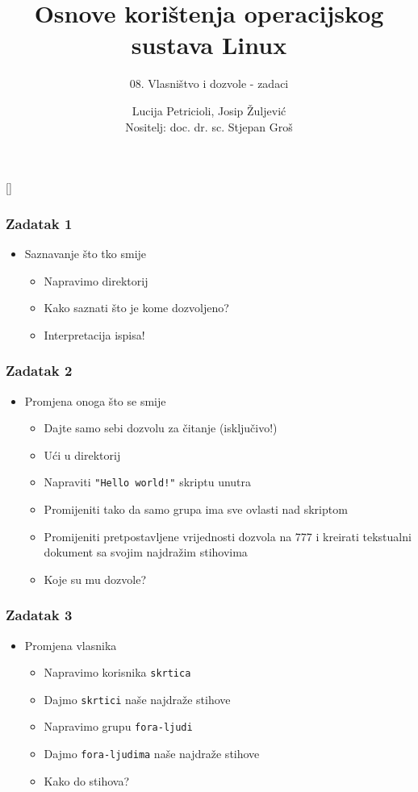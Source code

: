 \documentclass[table,usenames,dvipsnames] {beamer}
\title{Osnove korištenja operacijskog sustava Linux}
\subtitle{08. Vlasništvo i dozvole - zadaci}
\author[Lucija Petricioli, Josip Žuljević]{Lucija Petricioli, Josip Žuljević\\{\small Nositelj: doc. dr. sc. Stjepan Groš}}
\institute[FER]{Sveučilište u Zagrebu \\
				Fakultet elektrotehnike i računarstva}
\date{\todayiso}
\newcommand{\shell}[1]{\texttt{#1}}
\begin{document}
{
[] %

\begin{frame}
\maketitle
\end{frame}
}

\begin{frame}[t]
\frametitle{Zadatak 1}
\begin{itemize}
  \item Saznavanje što tko smije
  \begin{itemize}
    \item Napravimo direktorij
    \item Kako saznati što je kome dozvoljeno?
    \item Interpretacija ispisa! 
  \end{itemize}
\end{itemize}
\end{frame}

\begin{frame}[t]
\frametitle{Zadatak 2}
\begin{itemize}
  \item Promjena onoga što se smije
  \begin{itemize}
    \item Dajte samo sebi dozvolu za čitanje (isključivo!)
    \item Ući u direktorij
    \item Napraviti \shell{"Hello world!"} skriptu unutra
    \item Promijeniti tako da samo grupa ima sve ovlasti nad skriptom
    \item Promijeniti pretpostavljene vrijednosti dozvola na 777 i kreirati tekstualni dokument sa svojim najdražim stihovima
    \item Koje su mu dozvole?
  \end{itemize}
\end{itemize}
\end{frame}

\begin{frame}[t]
\frametitle{Zadatak 3}
\begin{itemize}
  \item Promjena vlasnika
  \begin{itemize}
    \item Napravimo korisnika \shell{skrtica}
    \item Dajmo \shell{skrtici} naše najdraže stihove
    \item Napravimo grupu \shell{fora-ljudi}
    \item Dajmo \shell{fora-ljudima} naše najdraže stihove
    \item Kako do stihova?
  \end{itemize}
\end{itemize}
\end{frame}
\end{document}
